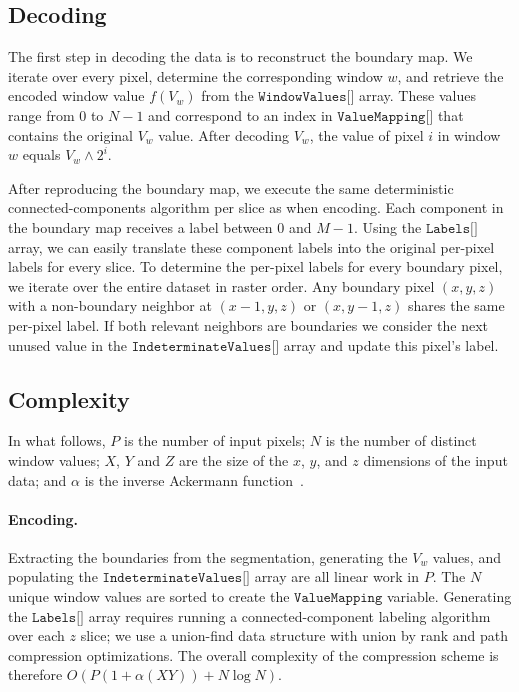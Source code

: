 \subsection{Decoding}

The first step in decoding the data is to reconstruct the boundary map. We iterate over every pixel, determine the corresponding window $w$, and retrieve the encoded window value $f(V_w)$ from the $\texttt{WindowValues[]}$ array. These values range from $0$ to $N - 1$ and correspond to an index in $\texttt{ValueMapping[]}$ that contains the original $V_w$ value. After decoding $V_w$, the value of pixel $i$ in window $w$ equals $V_w \land 2^i$.

After reproducing the boundary map, we execute the same deterministic connected-components algorithm per slice as when encoding. Each component in the boundary map receives a label between $0$ and $M - 1$. Using the $\texttt{Labels[]}$ array, we can easily translate these component labels into the original per-pixel labels for every slice. To determine the per-pixel labels for every boundary pixel, we iterate over the entire dataset in raster order. Any boundary pixel $(x, y, z)$ with a non-boundary neighbor at $(x - 1, y, z)$ or $(x, y - 1, z)$ shares the same per-pixel label. If both relevant neighbors are boundaries we consider the next unused value in the $\texttt{IndeterminateValues[]}$ array and update this pixel's label.

\subsection{Complexity}

In what follows, $P$ is the number of input pixels; $N$ is the number of distinct window values; $X$, $Y$ and $Z$ are the size of the $x$, $y$, and $z$ dimensions of the input data;  and $\alpha$ is the inverse Ackermann function~\cite{fredman1989cell}.
\paragraph{Encoding.}

Extracting the boundaries from the segmentation, generating the $V_w$ values, and populating the $\texttt{IndeterminateValues[]}$ array are all linear work in $P$. The $N$ unique window values are sorted to create the $\texttt{ValueMapping}$ variable. Generating the $\texttt{Labels[]}$ array requires running a connected-component labeling algorithm over each $z$ slice; we use a union-find data structure with union by rank and path compression optimizations.  The overall complexity of the compression scheme is therefore $O\left({P(1 + \alpha(XY)) + N\log{N}}\right)$.
